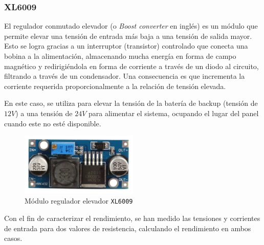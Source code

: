\subsubsection{XL6009}

El regulador conmutado elevador (o \textit{Boost converter} en inglés) es un módulo que permite elevar una tensión de entrada más baja a una tensión de salida mayor. Esto se logra gracias a un interruptor (transistor) controlado que conecta una bobina a la alimentación, almacenando mucha energía en forma de campo magnético y redirigiéndola en forma de corriente a través de un diodo al circuito, filtrando a través de un condensador. Una consecuencia es que incrementa la corriente requerida proporcionalmente a la relación de tensión elevada. \cite{xlsemi400KHz604}

En este caso, se utiliza para elevar la tensión de la batería de backup (tensión de $12 V$) a una tensión de $24 V$ para alimentar el sistema, ocupando el lugar del panel cuando este no esté disponible.

\begin{figure}[H]
    \centering
    \includegraphics[width=0.5\textwidth]{images/2-hardware/componentes/XL6009.png}
    \caption{Módulo regulador elevador \texttt{XL6009}}
    \label{fig:hardware/modulos/xl6009}
\end{figure}

Con el fin de caracterizar el rendimiento, se han medido las tensiones y corrientes de entrada para dos valores de resistencia, calculando el rendimiento en ambos casos.


